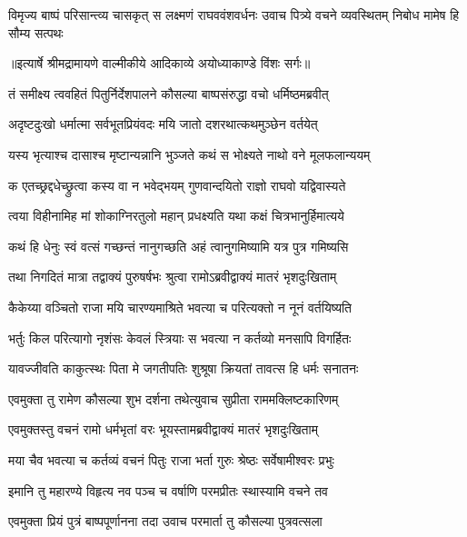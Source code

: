 \fourlineindentedshloka
{विमृज्य बाष्पं परिसान्त्व्य चासकृत्}
{स लक्ष्मणं राघववंशवर्धनः}
{उवाच पित्र्ये वचने व्यवस्थितम्}
{निबोध मामेष हि सौम्य सत्पथः} %


{॥इत्यार्षे श्रीमद्रामायणे वाल्मीकीये आदिकाव्ये अयोध्याकाण्डे विंशः सर्गः॥}


\twolineshloka
{तं समीक्ष्य त्ववहितं पितुर्निर्देशपालने}
{कौसल्या बाष्पसंरुद्धा वचो धर्मिष्ठमब्रवीत्} %

\twolineshloka
{अदृष्टदुःखो धर्मात्मा सर्वभूतप्रियंवदः}
{मयि जातो दशरथात्कथमुञ्छेन वर्तयेत्} %

\twolineshloka
{यस्य भृत्याश्च दासाश्च मृष्टान्यन्नानि भुञ्जते}
{कथं स भोक्ष्यते नाथो वने मूलफलान्ययम्} %

\twolineshloka
{क एतच्छ्रद्दधेच्छ्रुत्वा कस्य वा न भवेद्भयम्}
{गुणवान्दयितो राज्ञो राघवो यद्विवास्यते} %

\twolineshloka
{त्वया विहीनामिह मां शोकाग्निरतुलो महान्}
{प्रधक्ष्यति यथा कक्षं चित्रभानुर्हिमात्यये} %

\twolineshloka
{कथं हि धेनुः स्वं वत्सं गच्छन्तं नानुगच्छति}
{अहं त्वानुगमिष्यामि यत्र पुत्र गमिष्यसि} %

\twolineshloka
{तथा निगदितं मात्रा तद्वाक्यं पुरुषर्षभः}
{श्रुत्वा रामोऽब्रवीद्वाक्यं मातरं भृशदुःखिताम्} %

\twolineshloka
{कैकेय्या वञ्चितो राजा मयि चारण्यमाश्रिते}
{भवत्या च परित्यक्तो न नूनं वर्तयिष्यति} %

\twolineshloka
{भर्तुः किल परित्यागो नृशंसः केवलं स्त्रियाः}
{स भवत्या न कर्तव्यो मनसापि विगर्हितः} %

\twolineshloka
{यावज्जीवति काकुत्स्थः पिता मे जगतीपतिः}
{शुश्रूषा क्रियतां तावत्स हि धर्मः सनातनः} %

\twolineshloka
{एवमुक्ता तु रामेण कौसल्या शुभ दर्शना}
{तथेत्युवाच सुप्रीता राममक्लिष्टकारिणम्} %

\twolineshloka
{एवमुक्तस्तु वचनं रामो धर्मभृतां वरः}
{भूयस्तामब्रवीद्वाक्यं मातरं भृशदुःखिताम्} %

\twolineshloka
{मया चैव भवत्या च कर्तव्यं वचनं पितुः}
{राजा भर्ता गुरुः श्रेष्ठः सर्वेषामीश्वरः प्रभुः} %

\twolineshloka
{इमानि तु महारण्ये विहृत्य नव पञ्च च}
{वर्षाणि परमप्रीतः स्थास्यामि वचने तव} %

\twolineshloka
{एवमुक्ता प्रियं पुत्रं बाष्पपूर्णानना तदा}
{उवाच परमार्ता तु कौसल्या पुत्रवत्सला} %

